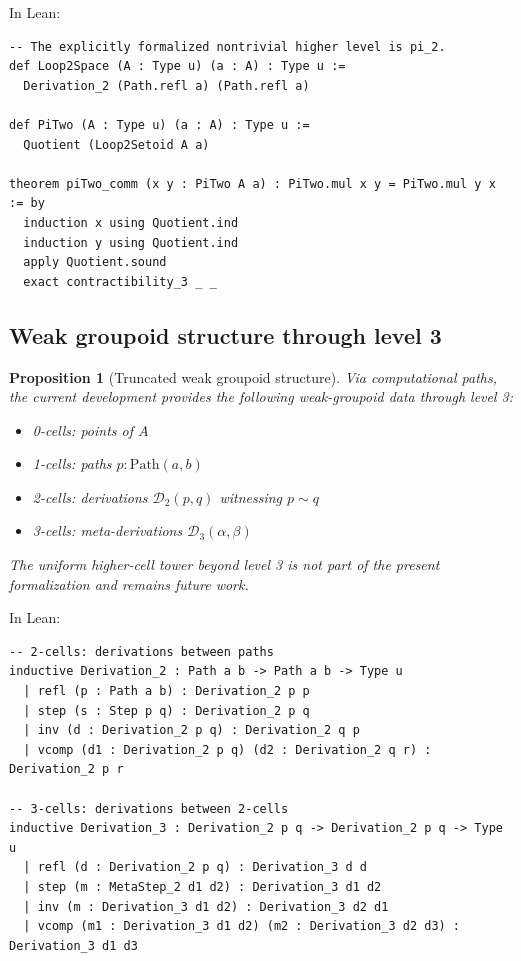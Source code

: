 \documentclass{lmcs}
\theoremstyle{definition}
\theoremstyle{plain}
\newtheorem{proposition}[definition]{Proposition}
\theoremstyle{remark}
\newcommand{\RwEq}{\sim}
\newcommand{\Path}{\mathrm{Path}}
\newcommand{\Der}{\mathcal{D}}
\begin{document}
In Lean:
\begin{lstlisting}
-- The explicitly formalized nontrivial higher level is pi_2.
def Loop2Space (A : Type u) (a : A) : Type u :=
  Derivation_2 (Path.refl a) (Path.refl a)

def PiTwo (A : Type u) (a : A) : Type u :=
  Quotient (Loop2Setoid A a)

theorem piTwo_comm (x y : PiTwo A a) : PiTwo.mul x y = PiTwo.mul y x := by
  induction x using Quotient.ind
  induction y using Quotient.ind
  apply Quotient.sound
  exact contractibility_3 _ _
\end{lstlisting}

\subsection{Weak groupoid structure through level 3}

\begin{proposition}[Truncated weak groupoid structure]
Via computational paths, the current development provides the following
weak-groupoid data through level 3:
\begin{itemize}
    \item 0-cells: points of $A$
    \item 1-cells: paths $p : \Path(a, b)$
    \item 2-cells: derivations $\Der_2(p, q)$ witnessing $p \RwEq q$
    \item 3-cells: meta-derivations $\Der_3(\alpha, \beta)$
\end{itemize}
The uniform higher-cell tower beyond level 3 is not part of the present
formalization and remains future work.
\end{proposition}

In Lean:
\begin{lstlisting}
-- 2-cells: derivations between paths
inductive Derivation_2 : Path a b -> Path a b -> Type u
  | refl (p : Path a b) : Derivation_2 p p
  | step (s : Step p q) : Derivation_2 p q
  | inv (d : Derivation_2 p q) : Derivation_2 q p
  | vcomp (d1 : Derivation_2 p q) (d2 : Derivation_2 q r) : Derivation_2 p r

-- 3-cells: derivations between 2-cells
inductive Derivation_3 : Derivation_2 p q -> Derivation_2 p q -> Type u
  | refl (d : Derivation_2 p q) : Derivation_3 d d
  | step (m : MetaStep_2 d1 d2) : Derivation_3 d1 d2
  | inv (m : Derivation_3 d1 d2) : Derivation_3 d2 d1
  | vcomp (m1 : Derivation_3 d1 d2) (m2 : Derivation_3 d2 d3) : Derivation_3 d1 d3
\end{lstlisting}
\end{document}
